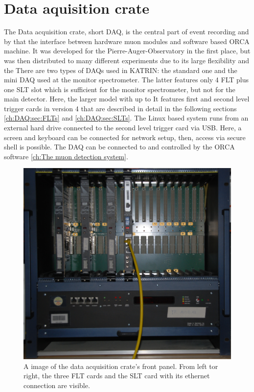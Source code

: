 \section{Data aquisition crate}
\label{ch:DAQ}
The Data acquisition crate, short DAQ, is the central part of event recording and by that the interface between hardware muon modules and software based ORCA machine. It was developed for the Pierre-Auger-Observatory in the first place, but was then distributed to many different experiments due to its large flexibility and the There are two types of DAQs used in KATRIN: the standard one and the mini DAQ used at the monitor spectrometer. The latter features only 4 FLT plus one SLT slot which is sufficient for the monitor spectrometer, but not for the main detector. Here, the larger model with up to  It features first and second level trigger cards in version \SI{4}{} that are described in detail in the following sections \ref{ch:DAQ:sec:FLTs} and \ref{ch:DAQ:sec:SLTs}. The Linux based system runs from an external hard drive connected to the second level trigger card via USB. Here, a screen and keyboard can be connected for network setup, then, access via secure shell is possible. The DAQ can be connected to and controlled by the ORCA software \ref{ch:The muon detection system}. 

  \begin{figure}
  \centering
  
  	\includegraphics[width = 0.7 \textwidth]{graphics/muonModules/mainSpec/DAQ.jpg}
  \caption[Data acquisition crate]{A image of the data acquisition crate's front panel. From left tor right, the three FLT cards and the SLT card with its ethernet connection are visible.}
  \label{fig:DAQ}
  \end{figure}

